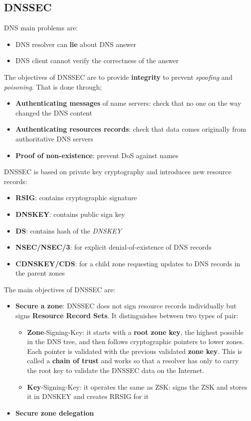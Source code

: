 \subsection{DNSSEC}
DNS main problems are:
\begin{itemize}
	\item DNS resolver can \textbf{lie} about DNS answer
	\item DNS client cannot verify the correctness of the answer
\end{itemize}
The objectives of DNSSEC are to provide \textbf{integrity} to prevent \textit{spoofing} and \textit{poisoning}. That is done through;
\begin{itemize}
	\item \textbf{Authenticating messages} of name servers: check that no one on the way changed the DNS content
	\item \textbf{Authenticating resources records}: check that data comes originally from authoritative DNS servers
	\item \textbf{Proof of non-existence}: prevent DoS against names
\end{itemize}
DNSSEC is based on private key cryptography and introduces new resource records:
\begin{itemize}
	\item \textbf{RSIG}: contains cryptographic signature
	\item \textbf{DNSKEY}: contains public sign key
	\item \textbf{DS}: contains hash of the \textit{DNSKEY}
	\item \textbf{NSEC/NSEC/3}: for explicit denial-of-existence of  DNS records
	\item \textbf{CDNSKEY/CDS}: for a child zone requesting updates to DNS records in the parent zones
\end{itemize}
The main objectives of DNSSEC are:
\begin{itemize}
	\item \textbf{Secure a zone}: DNSSEC does not sign resource records individually but signs \textbf{Resource Record Sets}. It distinguishes between two types of pair:
	\begin{itemize}
		\item \textbf{Zone}-Signing-Key: it starts with a \textbf{root zone key}, the highest possible in the DNS tree, and then follows cryptographic pointers to lower zones. Each pointer is validated with the previous validated \textbf{zone key}. This is called a \textbf{chain of trust} and works so that a resolver has only to carry the root key to validate the DNSSEC data on the Internet.
		\item \textbf{Key}-Signing-Key: it operates the same as ZSK: signs the ZSK and stores it in DNSKEY and creates RRSIG for it
	\end{itemize}
	\item \textbf{Secure zone delegation}
\end{itemize}

